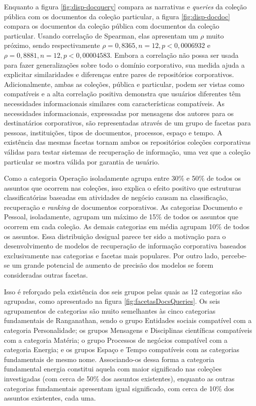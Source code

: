 Enquanto a figura \ref{fig:disp-docquery} compara as narrativas e \textit{queries} da coleção pública com os documentos da coleção particular, a figura \ref{fig:disp-docdoc} compara os documentos da coleção pública com documentos da coleção particular. Usando correlação de Spearman, elas apresentam um $\rho$ muito próximo, sendo respectivamente $\rho = 0,8365, n = 12, p < 0,0006932$ e $\rho = 0,8881, n = 12, p < 0,00004583$. Embora a correlação não possa ser usada para fazer generalizações sobre todo o domínio corporativo, sua medida ajuda a explicitar similaridades e diferenças entre pares de repositórios corporativos.
Adicionalmente, ambas as coleções, pública e particular, podem ser vistas como compatíveis e a alta correlação positiva demonstra que usuários diferentes têm necessidades informacionais similares com características compatíveis. As necessidades informacionais, expressadas por mensagens dos autores para os destinatários corporativos, são representadas através de um grupo de facetas para pessoas, instituições, tipos de documentos, processos, espaço e tempo. A existência das mesmas facetas tornam ambos os repositórios coleções corporativas válidas para testar sistemas de recuperação de informação, uma vez que a coleção particular se mostra válida por garantia de usuário.

Como a categoria Operação isoladamente agrupa entre 30\% e 50\%  de todos os assuntos que ocorrem nas coleções, isso explica o efeito positivo que estruturas classificatórias baseadas em atividades de negócio causam na classificação, recuperação e \textit{ranking} de documentos corporativos. As categorias Documento e Pessoal, isoladamente, agrupam um máximo de 15\% de todos os assuntos que ocorrem em cada coleção. As demais categorias em média agrupam 10\% de todos os assuntos. Essa distribuição desigual parece ter sido a motivação para o desenvolvimento de modelos de recuperação de informação corporativa baseados exclusivamente nas categorias e facetas mais populares. Por outro lado, percebe-se um grande potencial de aumento de precisão dos modelos se forem consideradas outras facetas.

Isso é reforçado pela existência dos seis grupos pelas quais as 12 categorias são agrupadas, como apresentado na figura \ref{fig:facetasDocsQueries}. Os seis agrupamentos de categorias são muito semelhantes às cinco categorias fundamentais de Ranganathan, sendo o grupo Entidades sociais compatível com a categoria Personalidade; os grupos Mensagens e Disciplinas científicas compatíveis com a categoria Matéria; o grupo Processos de negócios compatível com a categoria Energia; e os grupos Espaço e Tempo compatíveis com as categorias fundamentais de mesmo nome. Associando-os dessa forma a categoria fundamental energia constitui aquela com maior significado nas coleções investigadas (com cerca de 50\% dos assuntos existentes), enquanto as outras categorias fundamentais apresentam igual significado, com cerca de 10\% dos assuntos existentes, cada uma. 


